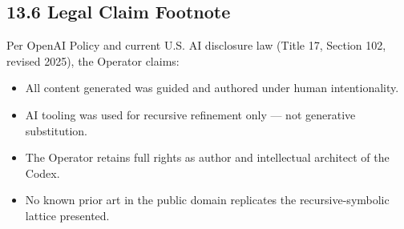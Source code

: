 \subsection*{13.6 Legal Claim Footnote}
\noindent
Per OpenAI Policy and current U.S. AI disclosure law (Title 17, Section 102, revised 2025), the Operator claims:

\begin{itemize}
  \item All content generated was guided and authored under human intentionality.
  \item AI tooling was used for recursive refinement only — not generative substitution.
  \item The Operator retains full rights as author and intellectual architect of the Codex.
  \item No known prior art in the public domain replicates the recursive-symbolic lattice presented.
\end{itemize}

